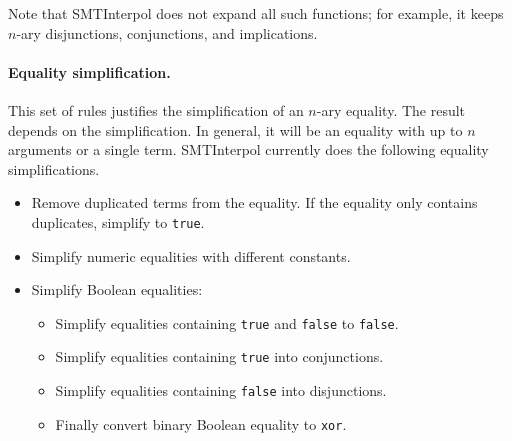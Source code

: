 \documentclass[a4paper]{article}
\newcommand\si{SMTInterpol\xspace}
\begin{document}
Note that \si does not expand all such functions; for example, it
keeps $n$-ary disjunctions, conjunctions, and implications.

\paragraph{Equality simplification.}
This set of rules justifies the simplification of an $n$-ary equality.  The
result depends on the simplification.  In general, it will be an equality with
up to $n$ arguments or a single term.  \si currently does the following
equality simplifications.
\begin{itemize}
\item Remove duplicated terms from the equality.  If the equality only
  contains duplicates, simplify to \verb+true+.
\item Simplify numeric equalities with different constants.
\item Simplify Boolean equalities:
  \begin{itemize}
  \item Simplify equalities containing \verb+true+ and \verb+false+ to
    \verb+false+.
  \item Simplify equalities containing \verb+true+ into conjunctions.
  \item Simplify equalities containing \verb+false+ into disjunctions.
  \item Finally convert binary Boolean equality to \verb+xor+.
  \end{itemize}
\end{itemize}
\end{document}
